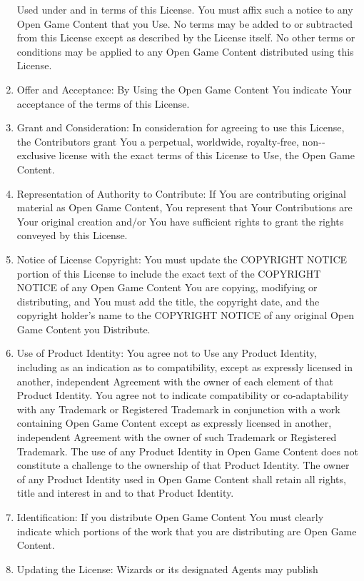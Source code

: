 \begin{enumerate}
  Used under and in terms of this License. You must affix such a notice
  to any Open Game Content that you Use. No terms may be added to or
  subtracted from this License except as described by the License
  itself. No other terms or conditions may be applied to any Open Game
  Content distributed using this License.
\item
  Offer and Acceptance: By Using the Open Game Content You indicate Your
  acceptance of the terms of this License.
\item
  Grant and Consideration: In consideration for agreeing to use this
  License, the Contributors grant You a perpetual, worldwide,
  royalty-free, non-­exclusive license with the exact terms of this
  License to Use, the Open Game Content.
\item
  Representation of Authority to Contribute: If You are contributing
  original material as Open Game Content, You represent that Your
  Contributions are Your original creation and/or You have sufficient
  rights to grant the rights conveyed by this License.
\item
  Notice of License Copyright: You must update the COPYRIGHT NOTICE
  portion of this License to include the exact text of the COPYRIGHT
  NOTICE of any Open Game Content You are copying, modifying or
  distributing, and You must add the title, the copyright date, and the
  copyright holder's name to the COPYRIGHT NOTICE of any original Open
  Game Content you Distribute.
\item
  Use of Product Identity: You agree not to Use any Product Identity,
  including as an indication as to compatibility, except as expressly
  licensed in another, independent Agreement with the owner of each
  element of that Product Identity. You agree not to indicate
  compatibility or co-adaptability with any Trademark or Registered
  Trademark in conjunction with a work containing Open Game Content
  except as expressly licensed in another, independent Agreement with
  the owner of such Trademark or Registered Trademark. The use of any
  Product Identity in Open Game Content does not constitute a challenge
  to the ownership of that Product Identity. The owner of any Product
  Identity used in Open Game Content shall retain all rights, title and
  interest in and to that Product Identity.
\item
  Identification: If you distribute Open Game Content You must clearly
  indicate which portions of the work that you are distributing are Open
  Game Content.
\item
  Updating the License: Wizards or its designated Agents may publish

\end{enumerate}
